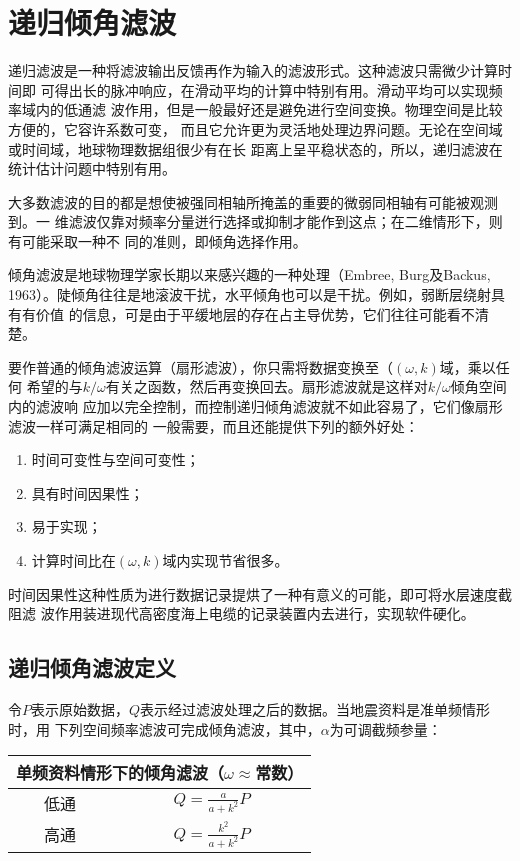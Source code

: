 \section{递归倾角滤波}
\label{sec:2.5}
递归滤波是一种将滤波输出反馈再作为输入的滤波形式。这种滤波只需微少计算时间即
可得出长的脉冲响应，在滑动平均的计算中特别有用。滑动平均可以实现频率域内的低通滤
波作用，但是一般最好还是避免进行空间变换。物理空间是比较方便的，它容许系数可变，
而且它允许更为灵活地处理边界问题。无论在空间域或时间域，地球物理数据组很少有在长
距离上呈平稳状态的，所以，递归滤波在统计估计问题中特别有用。

大多数滤波的目的都是想使被强同相轴所掩盖的重要的微弱同相轴有可能被观测到。一
维滤波仅靠对频率分量迸行选择或抑制才能作到这点；在二维情形下，则有可能采取一种不
同的准则，即倾角选择作用。

倾角滤波是地球物理学家长期以来感兴趣的一种处理（Embree, Burg及Backus,
1963）。陡倾角往往是地滚波干扰，水平倾角也可以是干扰。例如，弱断层绕射具有有价值
的信息，可是由于平缓地层的存在占主导优势，它们往往可能看不清楚。

要作普通的倾角滤波运算（扇形滤波），你只需将数据变换至（$(\omega,k)$域，乘以任何
希望的与$k/\omega$有关之函数，然后再变换回去。扇形滤波就是这样对$k/\omega$倾角空间内的滤波响
应加以完全控制，而控制递归倾角滤波就不如此容易了，它们像扇形滤波一样可满足相同的
一般需要，而且还能提供下列的额外好处：
\begin{enumerate}
\item 时间可变性与空间可变性；
\item
  具有时间因果性；
\item
  易于实现；
\item
  计算时间比在$(\omega,k)$域内实现节省很多。
\end{enumerate}
时间因果性这种性质为进行数据记录提烘了一种有意义的可能，即可将水层速度截阻滤
波作用装进现代高密度海上电缆的记录装置内去进行，实现软件硬化。

\subsection{递归倾角滤波定义}
\label{sec:2.5.1}
令$P$表示原始数据，$Q$表示经过滤波处理之后的数据。当地震资料是准单频情形时，用
下列空间频率滤波可完成倾角滤波，其中，$\alpha$为可调截频参量：

\begin{tabular}{|c|c|}
\hline
\multicolumn{2}{|c|}{单频资料情形下的倾角滤波（$\omega\approx$常数）}\\ \hline
低通&$Q=\frac{a}{a+k^2}P$\\ \hline
高通&$Q=\frac{k^2}{a+k^2}P$ \\ \hline
\end{tabular}

